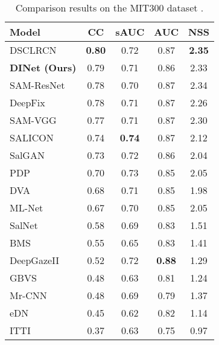 \begin{table}[]
	\centering
	\caption{Comparison results on the MIT300 dataset \cite{Judd_2012}. }
	\label{mit300}
	\begin{tabular}{|l|c c c c |}
		\hline
		Model      & CC   & sAUC & AUC  & NSS   \\ \hline
		DSCLRCN \cite{liu2016deep}   & \textbf{0.80}  & 0.72 & 0.87 & \textbf{2.35}  \\ \hline
		\textbf{DINet (Ours)}      & 0.79 & 0.71 & 0.86 & 2.33  \\ \hline
		SAM-ResNet \cite{cornia2016predicting}   & 0.78 & 0.70  & 0.87 & 2.34  \\ \hline
		DeepFix \cite{kruthiventi2017deepfix}       & 0.78 & 0.71 & 0.87 & 2.26  \\ \hline
		SAM-VGG \cite{cornia2016predicting}      & 0.77 & 0.71 & 0.87 & 2.30  \\ \hline
		SALICON \cite{huang2015salicon}    & 0.74 & \textbf{0.74} & 0.87 & 2.12  \\ \hline
		SalGAN \cite{pan2017salgan}     & 0.73 & 0.72 & 0.86 & 2.04 \\ \hline
		PDP   \cite{jetley2016end}      & 0.70  & 0.73 & 0.85 & 2.05   \\ \hline
		DVA   \cite{wang2017deep}           & 0.68 & 0.71 & 0.85 & 1.98  \\ \hline
		ML-Net  \cite{cornia2016deep}    & 0.67 & 0.70  & 0.85 & 2.05  \\ \hline
				SalNet  \cite{pan2016shallow}    & 0.58 & 0.69 & 0.83 & 1.51 \\ \hline
		BMS     \cite{zhang2013saliency}    & 0.55 & 0.65 & 0.83 & 1.41 \\ \hline
		DeepGazeII  \cite{kummerer2016deepgaze} & 0.52 & 0.72 & \textbf{0.88} & 1.29 \\ \hline
		GBVS     \cite{harel2007graph}      & 0.48 & 0.63 & 0.81 & 1.24 \\ \hline
		Mr-CNN  \cite{liu2016learning}       & 0.48 & 0.69 & 0.79 & 1.37 \\ \hline
		eDN     \cite{vig2014large}     & 0.45 & 0.62 & 0.82 & 1.14 \\ \hline
		ITTI   \cite{itti1998model}      & 0.37 & 0.63 & 0.75 & 0.97  \\ \hline
	\end{tabular}
	\vspace{-4mm}
\end{table}

